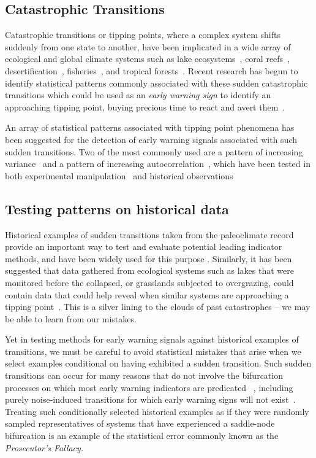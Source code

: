 \documentclass[authoryear,review,12pt]{elsarticle}
\begin{document}
\subsection*{Catastrophic Transitions}

Catastrophic transitions or tipping points, where a complex system 
shifts suddenly from one state to another, have been implicated in
a wide array of ecological and global climate systems such as lake
ecosystems~\citep{Carpenter2011}, coral reefs~\citep{Mumby2007},
desertification~\citep{Kefi2007}, fisheries~\citep{Berkes2006}, and 
tropical forests~\citep{Hirota2011}.  Recent research has begun to
identify statistical patterns commonly associated with these sudden
catastrophic transitions which could be used as an \emph{early warning sign}
to identify an approaching tipping point, buying precious time 
to react and avert them~\citep{Scheffer2009, Lenton2011}.  

An array of statistical patterns associated with tipping point phenomena has
been suggested for the detection of early warning signals associated with
such sudden transitions.  Two of the most commonly used are a pattern of
increasing variance~\citep{Carpenter2006} and a pattern of increasing 
autocorrelation~\citep{vanNes2007}, which have been tested in both experimental
manipulation~\citep{Drake2010, Carpenter2011, Veraart2011} and historical 
observations~\citep{Livina2007,Dakos2008,Lenton2012,Ditlevsen2010,Guttal2008,Thompson2010}


\subsection*{Testing patterns on historical data}

Historical examples of sudden transitions taken from the paleoclimate record
provide an important way to test and evaluate potential leading indicator 
methods, and have been widely used for this purpose 
\citep{Livina2007,Dakos2008,Lenton2012,Ditlevsen2010,Guttal2008,Thompson2010}.
Similarly, it has been suggested that data gathered from ecological systems such
as lakes that were monitored before the collapsed, or grasslands subjected to
overgrazing, could contain data that could help reveal when similar systems 
are approaching a tipping point~\citet{Inman2011}.  This is a silver lining to
the clouds of past catastrophes -- we may be able to learn from our mistakes. 

Yet in testing methods for early warning signals against historical examples of
transitions, we must be careful to avoid statistical mistakes that arise when
we select examples conditional on having exhibited a sudden transition.  Such
sudden transitions can occur for many reasons that do not involve the 
bifurcation processes on which most early warning indicators are predicated
~\citep{Hastings2010}, including purely noise-induced transitions for which 
early warning signs will not exist~\citep{Ditlevsen2010, Lenton2011}. Treating 
such conditionally selected historical examples as if they were randomly 
sampled representatives of systems that have experienced a saddle-node 
bifurcation is an example of the statistical error commonly known as the
\emph{Prosecutor's Fallacy.}
\end{document}
